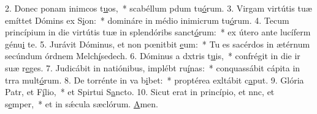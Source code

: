 2. Donec ponam inimcos t\uline{u}os,~* scabéllum pdum tu\uline{ó}rum.
3. Virgam virtútis tuæ emíttet Dómins ex S\uline{i}on:~* domináre in médio inimicrum tu\uline{ó}rum.
4. Tecum princípium in die virtútis tuæ in splendóribs sanct\uline{ó}rum:~* ex útero ante lucíferm génu\uline{i} te.
5. Jurávit Dóminus, et non pœnitbit \uline{e}um:~* Tu es sacérdos in ætérnum secúndum órdnem Melch\uline{í}sedech.
6. Dóminus a dxtris t\uline{u}is,~* confrégit in die ir suæ r\uline{e}ges.
7. Judicábit in natiónibus, implébt ru\uline{í}nas:~* conquassábit cápita in trra mult\uline{ó}rum.
8. De torrénte in va b\uline{i}bet:~* proptérea exltábit c\uline{a}put.
9. Glória Patr, et F\uline{í}lio,~* et Spirtui S\uline{a}ncto.
10. Sicut erat in princípio, et nnc, et s\uline{e}mper,~* et in sǽcula sæclórum. \uline{A}men.
